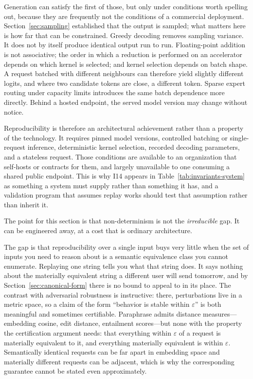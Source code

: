 Generation can satisfy the first of those, but only under conditions worth
spelling out, because they are frequently not the conditions of a commercial
deployment. Section~\ref{sec:sampling} established that the output is sampled; what
matters here is how far that can be constrained. Greedy decoding removes sampling
variance. It does not by itself produce
identical output run to run. Floating-point addition is not associative; the order in
which a reduction is performed on an accelerator depends on which kernel is selected;
and kernel selection depends on batch shape. A request batched with different
neighbours can therefore yield slightly different logits, and where two candidate
tokens are close, a different token. Sparse expert routing under capacity limits
introduces the same batch dependence more directly. Behind a hosted endpoint, the
served model version may change without notice.

Reproducibility is therefore an architectural achievement rather than a property of
the technology. It requires pinned model versions, controlled batching or
single-request inference, deterministic kernel selection, recorded decoding
parameters, and a stateless request. Those conditions are available to an
organization that self-hosts or contracts for them, and largely unavailable to one
consuming a shared public endpoint. This is why I14 appears in
Table~\ref{tab:invariants-system} as something a system must supply rather than
something it has, and a validation program that assumes replay works should test
that assumption rather than inherit it.

The point for this section is that non-determinism is not the \emph{irreducible}
gap. It can be engineered away, at a cost that is ordinary architecture.

The gap is that reproducibility over a single input buys very little when the set of
inputs you need to reason about is a semantic equivalence class you cannot
enumerate. Replaying one string tells you what that string does. It says nothing
about the materially equivalent string a different user will send tomorrow, and by
Section~\ref{sec:canonical-form} there is no bound to appeal to in its place. The
contrast with adversarial robustness is instructive: there, perturbations live in a
metric space, so a claim of the form ``behavior is stable within $\varepsilon$'' is
both meaningful and sometimes certifiable. Paraphrase admits distance measures---
embedding cosine, edit distance, entailment scores---but none with the property the
certification argument needs: that everything within $\varepsilon$ of a request is
materially equivalent to it, and everything materially equivalent is within
$\varepsilon$. Semantically identical requests can be far apart in embedding space
and materially different requests can be adjacent, which is why the corresponding
guarantee cannot be stated even approximately.

